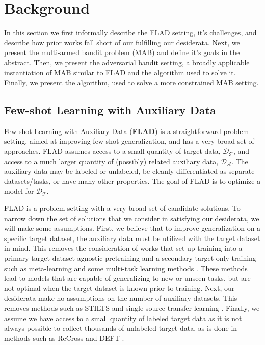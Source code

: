 \section{Background}
In this section we first informally describe the FLAD setting, it's challenges, and describe how prior works fall short of our fulfilling our desiderata. Next, we present the multi-armed bandit problem (MAB) and define it's goals in the abstract. Then, we present the adversarial bandit setting, a broadly applicable instantiation of MAB similar to FLAD and the \ex{} algorithm used to solve it. Finally, we present the \ucb{} algorithm, used to solve a more constrained MAB setting.

\subsection{Few-shot Learning with Auxiliary Data}
Few-shot Learning with Auxiliary Data (\textbf{FLAD}) is a straightforward problem setting, aimed at improving few-shot generalization, and has a very broad set of approaches. FLAD assumes access to a small quantity of target data, $\mathcal{D}_{\mathcal{T}}$, and access to a much larger quantity of (possibly) related auxiliary data, $\mathcal{D}_{\mathcal{A}}$. The auxiliary data may be labeled or unlabeled, be cleanly differentiated as separate datasets/tasks, or have many other properties. The goal of FLAD is to optimize a model for $\mathcal{D}_{\mathcal{T}}$.

FLAD is a problem setting with a very broad set of candidate solutions. To narrow down the set of solutions that we consider in satisfying our desiderata, we will make some assumptions.
First, we believe that to improve generalization on a specific target dataset, the auxiliary data must be utilized with the target dataset in mind. This removes the consideration of works that set up training into a primary target dataset-agnostic pretraining and a secondary target-only training such as meta-learning \citep{bansal-etal-2020-self} and some multi-task learning methods \citep{aghajanyan-etal-2021-muppet, sanh2022multitask}. These methods lead to models that are capable of generalizing to new or unseen tasks, but are not optimal when the target dataset is known prior to training.
Next, our desiderata make no assumptions on the number of auxiliary datasets. This removes methods such as STILTS \citep{phang2018sentence} and single-source transfer learning \citep{feta_albalak}.
Finally, we assume we have access to a small quantity of labeled target data as it is not always possible to collect thousands of unlabeled target data, as is done in methods such as ReCross \citep{Lin2022UnsupervisedCG} and DEFT \citep{Ivison2022DEFT}.

